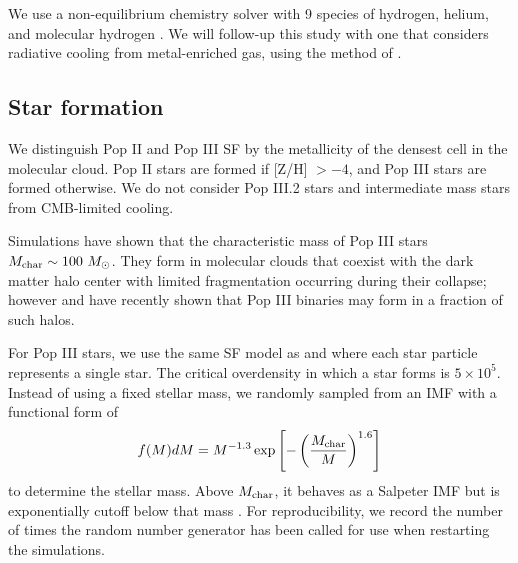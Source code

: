 \documentclass[apjl]{emulateapj}
\begin{document}
We use a non-equilibrium chemistry solver with 9 species of hydrogen,
helium, and molecular hydrogen \citep{Abel97}.  We will follow-up this
study with one that considers radiative cooling from metal-enriched
gas, using the method of \citet{2008MNRAS.385.1443S}.


\subsection{Star formation}

We distinguish Pop II and Pop III SF by the metallicity of the densest
cell in the molecular cloud.  Pop II stars are formed if [Z/H] $> -4$,
and Pop III stars are formed otherwise.  We do not consider Pop III.2
stars and intermediate mass stars from CMB-limited cooling.

Simulations have shown that the characteristic mass of Pop III stars
$M_{\rm char} \sim 100~\Ms$.  They form in molecular clouds that
coexist with the dark matter halo center with limited fragmentation
occurring during their collapse; however \citet{2009Sci...325..601T}
and \citet{Stacy10_Binary} have recently shown that Pop III binaries
may form in a fraction of such halos.


For Pop III stars, we use the same SF model as \citet{Abel07} and
\citet{Wise08_Gal} where each star particle represents a single star.
The critical overdensity in which a star forms is $5 \times 10^5$.
Instead of using a fixed stellar mass, we randomly sampled from an IMF
with a functional form of
%
\begin{equation}
\label{eqn:imf}
f(M)dM = M^{-1.3} \exp\left[-\left(\frac{M_{\rm char}}{M}\right)^{1.6}\right]
\end{equation}
to determine the stellar mass.  Above $M_{\rm char}$, it behaves as a
Salpeter IMF but is exponentially cutoff below that mass
\citep{Chabrier03, Clark09}.  For reproducibility, we record the
number of times the random number generator \citep[Mersenne
  twister;][]{MTwister} has been called for use when restarting the
simulations.
\end{document}
